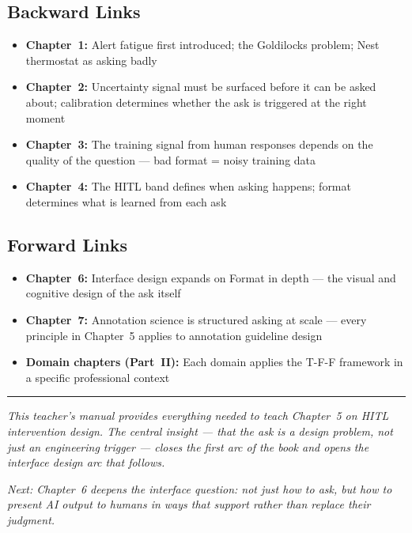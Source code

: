 \subsection{Backward Links}
\begin{itemize}
    \item \textbf{Chapter~1:} Alert fatigue first introduced; the Goldilocks problem; Nest thermostat as asking badly
    \item \textbf{Chapter~2:} Uncertainty signal must be surfaced before it can be asked about; calibration determines whether the ask is triggered at the right moment
    \item \textbf{Chapter~3:} The training signal from human responses depends on the quality of the question --- bad format = noisy training data
    \item \textbf{Chapter~4:} The HITL band defines when asking happens; format determines what is learned from each ask
\end{itemize}

\subsection{Forward Links}
\begin{itemize}
    \item \textbf{Chapter~6:} Interface design expands on Format in depth --- the visual and cognitive design of the ask itself
    \item \textbf{Chapter~7:} Annotation science is structured asking at scale --- every principle in Chapter~5 applies to annotation guideline design
    \item \textbf{Domain chapters (Part~II):} Each domain applies the T-F-F framework in a specific professional context
\end{itemize}

\bigskip
\begin{center}
\rule{0.5\textwidth}{0.4pt}
\end{center}
\bigskip

\noindent\textit{This teacher's manual provides everything needed to teach Chapter~5 on HITL intervention design. The central insight --- that the ask is a design problem, not just an engineering trigger --- closes the first arc of the book and opens the interface design arc that follows.}

\medskip
\noindent\textit{Next: Chapter~6 deepens the interface question: not just how to ask, but how to present AI output to humans in ways that support rather than replace their judgment.}
